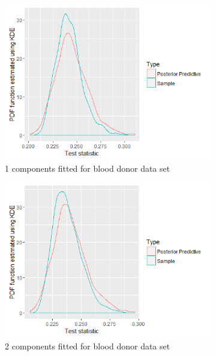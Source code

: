 \begin{figure}[!htb]
\centering
\begin{subfigure}[b]{0.4\textwidth}
		\includegraphics[width=\textwidth]{mainmatter/chapter_6_blood_donor/ppc_1comp.png}
        \caption{\label{fig : ppc_blood_donor_1comp}1 components fitted for blood donor data set}
	\end{subfigure}
	\begin{subfigure}[b]{0.4\textwidth}
		\includegraphics[width=\textwidth]{mainmatter/chapter_6_blood_donor/ppc_2comp.png}	
          \caption{\label{fig : ppc_blood_donor_2comp}2 components fitted for blood donor data set}
	\end{subfigure}
	\begin{subfigure}[b]{0.4\textwidth}

\end{subfigure}
\end{figure}
